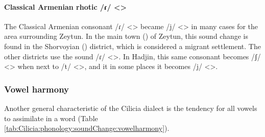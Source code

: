 \paragraph{Classical Armenian rhotic /ɾ/ <>}

The Classical Armenian consonant /ɾ/ <> became /j/ <> in many cases for the area surrounding Zeytun. In the main town () of Zeytun, this sound change is found in the Shorvoyian () district, which is considered a migrant settlement. The other districts use the sound /ɾ/ <>. In Hadjin, this same consonant becomes /ʃ/ <> when next to /t/ <>, and it in some places it becomes /j/ <>. 

\subsubsection{Vowel harmony}\label{section:cilicia:phono:soundchange:vowelharmony}

Another general characteristic of the Cilicia dialect is the tendency for all vowels to assimilate in a word (Table \ref{tab:Cilicia:phonology:soundChange:vowelharmony}). 








